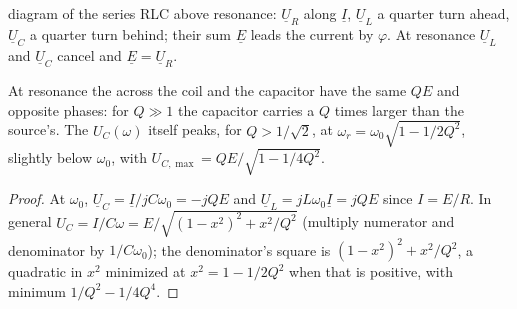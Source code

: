 \begin{omfigure}

{\small {} diagram of the series RLC above resonance: $\underline U_R$
along $\underline I$, $\underline U_L$ a quarter turn ahead, $\underline U_C$
a quarter turn behind; their sum $\underline E$ leads the current by
$\varphi$. At resonance $\underline U_L$ and $\underline U_C$ cancel and
$\underline E = \underline U_R$.}
\end{omfigure}

\begin{proposition}\label{prop:b1:sinusoidal-impedance:overvoltage}
At resonance the  across the coil and the capacitor have the
same  $QE$ and opposite phases: for $Q \gg 1$ the capacitor
carries a  $Q$ times larger than the source's. The 
$U_C(\omega)$ itself peaks, for $Q > 1/\sqrt2$, at $\omega_r =
\omega_0\sqrt{1 - 1/2Q^2}$, slightly below $\omega_0$, with
$U_{C,\max} = QE/\sqrt{1 - 1/4Q^2}$.
\end{proposition}

\begin{proof}
At $\omega_0$, $\underline U_C = \underline I/jC\omega_0 = -jQE$ and
$\underline U_L = jL\omega_0\underline I = jQE$ since $I = E/R$. In
general $U_C = I/C\omega = E/\sqrt{(1 - x^2)^2 + x^2/Q^2}$ (multiply
numerator and denominator by $1/C\omega_0$); the denominator's square
is $(1 - x^2)^2 + x^2/Q^2$, a quadratic in $x^2$ minimized at $x^2 =
1 - 1/2Q^2$ when that is positive, with minimum $1/Q^2 - 1/4Q^4$.
\end{proof}

